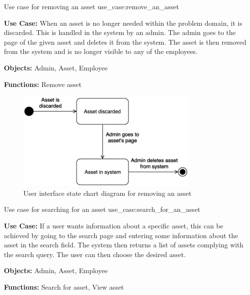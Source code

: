 \newpage

    {Use case for removing an asset}
    {use_case:remove_an_asset}
    {
        \textbf{Use Case:} When an asset is no longer needed within the problem domain, it is discarded. This is handled in the system by an admin. The admin goes to the page of the given asset and deletes it from the system. The asset is then removed from the system and is no longer visible to any of the employees.
    
        \vskip 0.2cm
        
        \textbf{Objects:} Admin, Asset, Employee
        
        \vskip 0.2cm
        
        \textbf{Functions:} Remove asset
    }

\begin{figure}[H]
    \centering
    \includegraphics[width=0.8\textwidth]{figures/UseCases/UC_Remove_asset.png}
    \caption{User interface state chart diagram for removing an asset}
    \label{fig:remove_asset_statechart}
\end{figure}

\newpage

    {Use case for searching for an asset}
    {use_case:search_for_an_asset}
    {
        \textbf{Use Case:} If a user wants information about a specific asset, this can be achieved by going to the search page and entering some information about the asset in the search field. The system then returns a list of assets complying with the search query. The user can then choose the desired asset.
    
        \vskip 0.2cm
        
        \textbf{Objects:} Admin, Asset, Employee
        
        \vskip 0.2cm
        
        \textbf{Functions:} Search for asset, View asset
    }

